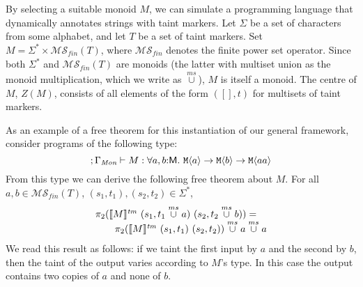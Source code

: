 \newcommand{\mscup}{\stackrel{ms}\cup}

\begin{example}
  By selecting a suitable monoid $M$, we can simulate a programming
  language that dynamically annotates strings with taint markers. Let
  $\Sigma$ be a set of characters from some alphabet, and let $T$ be a
  set of taint markers. Set $M = \Sigma^* \times
  \mathcal{MS}_{\mathit{fin}}(T)$, where $\mathcal{MS}_{\mathit{fin}}$
  denotes the finite power set operator. Since both $\Sigma^*$ and
  $\mathcal{MS}_{\mathit{fin}}(T)$ are monoids (the latter with
  multiset union as the monoid multiplication, which we write as
  $\mscup$), $M$ is itself a monoid. The centre of $M$, $Z(M)$,
  consists of all elements of the form $([], t)$ for multisets of
  taint markers.

  As an example of a free theorem for this instantiation of our
  general framework, consider programs of the following type:
  \begin{displaymath}
    ; \Gamma_{\textit{Mon}} \vdash M : \forall a,b\mathord:\mathsf{M}.\ \textup{\texttt{M}}\langle a \rangle \to \textup{\texttt{M}}\langle b \rangle \to \textup{\texttt{M}}\langle aa \rangle
  \end{displaymath}
  From this type we can derive the following free theorem about
  $M$. For all $a, b \in \mathcal{MS}_{\mathit{fin}}(T)$, $(s_1,t_1),
  (s_2,t_2) \in \Sigma^*$,
  \begin{displaymath}
    \begin{array}{l}
      \pi_2(\tmSem{M}\ (s_1,t_1 \mscup a)\ (s_2,t_2 \mscup b)) = \\
      \hspace{2em}\pi_2(\tmSem{M}\ (s_1,t_1)\ (s_2,t_2)) \mscup a \mscup a
    \end{array}
  \end{displaymath}
  We read this result as follows: if we taint the first input by $a$
  and the second by $b$, then the taint of the output varies according
  to $M$'s type. In this case the output contains two copies of $a$
  and none of $b$.
\end{example}




